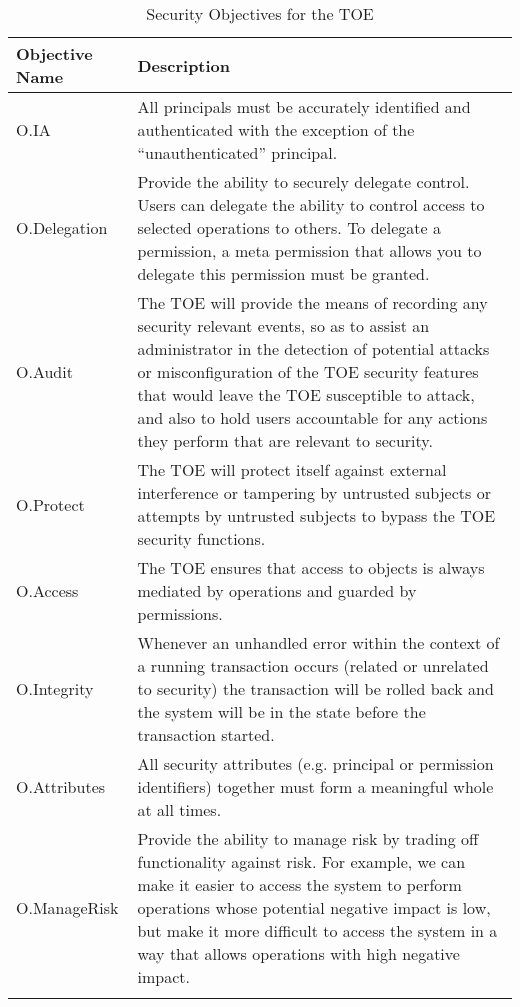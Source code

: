 \documentclass[12pt,english]{scrbook}
\begin{document}
\begin{longtable}[c]{lp{10cm}}
  \toprule
  Objective Name & Description \\
  \midrule\endhead
  
  O.IA
   & 
  All principals must be accurately identified and
  authenticated with the exception of the ``unauthenticated''
  principal.
   \\

  O.Delegation
   & 
  Provide the ability to securely delegate control. Users can
  delegate the ability to control access to selected
  operations to others. To delegate a permission, a meta permission
  that allows you to delegate this permission must be granted.
   \\

  O.Audit
   & 
  The TOE will provide the means of recording any
  security relevant events, so as to assist an
  administrator in the detection of potential attacks
  or misconfiguration of the TOE security features
  that would leave the TOE susceptible to attack, and
  also to hold users accountable for any actions
  they perform that are relevant to security.
   \\

  O.Protect
   & 
  The TOE will protect itself against external
  interference or tampering by untrusted subjects or
  attempts by untrusted subjects to bypass the TOE
  security functions.
   \\

  O.Access
   & 
  The TOE ensures that access to objects is always
  mediated by operations and guarded by permissions.
   \\

  O.Integrity
   & 
  Whenever an unhandled error within the context of a
  running transaction occurs (related or unrelated
  to security) the transaction will be rolled back
  and the system will be in the state before the
  transaction started.
   \\

  O.Attributes &  All security attributes (e.g. principal or permission
    identifiers) together must form a meaningful whole at all times. \\

  O.ManageRisk
   & 
  Provide the ability to manage risk by trading off
  functionality against risk. For example, we can
  make it easier to access the system to perform
  operations whose potential negative impact is
  low, but make it more difficult to access the
  system in a way that allows operations with high
  negative impact.
  \\
  \bottomrule
  \caption{Security Objectives for the TOE}
\end{longtable}
\end{document}
